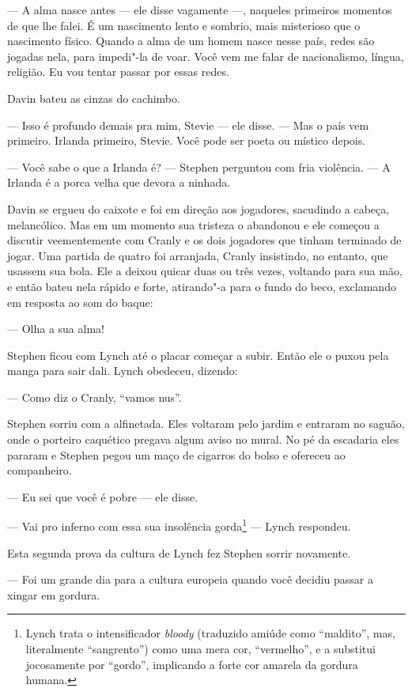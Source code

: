  --- A alma nasce antes --- ele disse vagamente ---, naqueles primeiros momentos
de que lhe falei. É um nascimento lento e sombrio, mais misterioso que
o nascimento físico. Quando a alma de um homem nasce nesse país, redes
são jogadas nela, para impedi"-la de voar. Você vem me falar de
nacionalismo, língua, religião. Eu vou tentar passar por essas redes.

Davin bateu as cinzas do cachimbo.

 --- Isso é profundo demais pra mim, Stevie --- ele disse. --- Mas o país vem
primeiro. Irlanda primeiro, Stevie. Você pode ser poeta ou místico
depois.

 --- Você sabe o que a Irlanda é? --- Stephen perguntou com fria violência. --- A 
Irlanda é a porca velha que devora a ninhada.

Davin se ergueu do caixote e foi em direção aos jogadores, sacudindo a
cabeça, melancólico. Mas em um momento sua tristeza o abandonou e ele
começou a discutir veementemente com Cranly e os dois jogadores que
tinham terminado de jogar. Uma partida de quatro foi arranjada, Cranly
insistindo, no entanto, que usassem sua bola. Ele a deixou quicar duas
ou três vezes, voltando para sua mão, e então bateu nela rápido e
forte, atirando"-a para o fundo do beco, exclamando em resposta ao som
do baque:

 --- Olha a sua alma!

Stephen ficou com Lynch até o placar começar a subir. Então ele o puxou
pela manga para sair dali. Lynch obedeceu, dizendo:

 --- Como diz o Cranly, ``vamos nus''.


Stephen sorriu com a alfinetada. Eles voltaram pelo jardim e entraram no
saguão, onde o porteiro caquético pregava algum aviso no mural. No pé
da escadaria eles pararam e Stephen pegou um maço de cigarros do bolso
e ofereceu ao companheiro.

 --- Eu sei que você é pobre --- ele disse.

 --- Vai pro inferno com essa sua insolência gorda\footnote{ Lynch
trata o intensificador \textit{bloody} (traduzido amiúde como “maldito”,
mas, literalmente “sangrento”) como uma mera cor, “vermelho”, e a substitui
jocosamente por “gordo”, implicando a forte cor amarela da gordura humana.} --- 
Lynch respondeu.

Esta segunda prova da cultura de Lynch fez Stephen sorrir novamente.

 --- Foi um grande dia para a cultura europeia quando você decidiu passar a xingar em gordura.

